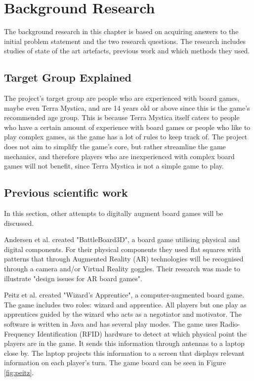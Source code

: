 \chapter{Background Research}\label{ch:bgres}
The background research in this chapter is based on acquiring answers to the initial problem statement and the two research questions. The research includes studies of state of the art artefacts, previous work and which methods they used. 


\section{Target Group Explained}
The project's target group are people who are experienced with board games, maybe even Terra Mystica, and are 14 years old or above since this is the game's recommended age group. This is because Terra Mystica itself caters to people who have a certain amount of experience with board games or people who like to play complex games, as the game has a lot of rules to keep track of. The project does not aim to simplify the game's core, but rather streamline the game mechanics, and therefore players who are inexperienced with complex board games will not benefit, since Terra Mystica is not a simple game to play.



\section{Previous scientific work}
In this section, other attempts to digitally augment board games will be discussed.

Andersen et al. \citep{andersen_designing_2004} created "BattleBoard3D", a board game utilising physical and digital components. For their physical components they used flat squares with patterns that through Augmented Reality (AR) technologies will be recognised through a camera and/or Virtual Reality goggles. Their research was made to illustrate "design issues for AR board games".

Peitz et al. \citep{peitzWizards2006} created "Wizard's Apprentice", a computer-augmented board game. The game includes two roles: wizard and apprentice. All players but one play as apprentices guided by the wizard who acts as a negotiator and motivator. The software is written in Java and has several play modes. The game uses Radio-Frequency Identification (RFID) hardware to detect at which physical point the players are in the game. It sends this information through antennas to a laptop close by. The laptop projects this information to a screen that displays relevant information on each player's turn. The game board can be seen in Figure \ref{fig:peitz}.

